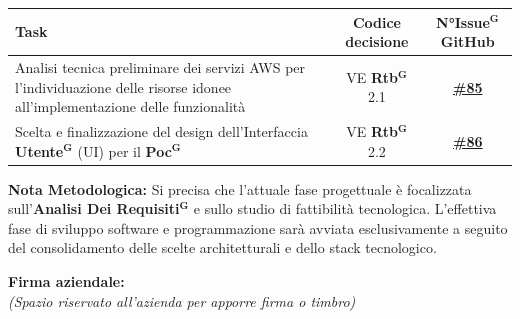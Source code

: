 \documentclass[a4paper,12pt]{article}
\newcommand{\term}[1]{\textbf{#1}$^\mathbf{G}$}
\begin{document}
\begin{center}
\small
\renewcommand{\arraystretch}{1.2} 
\begin{tabular}{|p{}|c|c|}
\hline
\rowcolor{gray!60} 
\textbf{Task} & \textbf{Codice decisione} & \textbf{N°\term{Issue} GitHub} \\
\hline
\rowcolor{white}
Analisi tecnica preliminare dei servizi AWS per l'individuazione delle risorse idonee all'implementazione delle funzionalità & VE \term{Rtb} 2.1 & \href{https://github.com/SWE-BitByBit/SWE-docs/issues/85}{\textbf{\#85}} \\
\hline
\rowcolor{gray!20}
Scelta e finalizzazione del design dell'Interfaccia \term{Utente} (UI) per il \term{Poc} & VE \term{Rtb} 2.2 & \href{https://github.com/SWE-BitByBit/SWE-docs/issues/86}{\textbf{\#86}} \\
\hline
\end{tabular}
\end{center}

\textbf{Nota Metodologica:} Si precisa che l'attuale fase progettuale è focalizzata sull'\term{Analisi Dei Requisiti} e sullo studio di fattibilità tecnologica. L'effettiva fase di sviluppo software e programmazione sarà avviata esclusivamente a seguito del consolidamento delle scelte architetturali e dello stack tecnologico.

\vspace*{\fill} %
\noindent
\begin{minipage}{0.60\textwidth}
    {\small
    \textbf{Firma aziendale:}\\[0.3cm]
    \textit{(Spazio riservato all’azienda per apporre firma o timbro)}\\[0.8cm]
    \fbox{\rule{0pt}{2.5cm}\rule{5cm}{0pt}} %
    }
\end{minipage}
\end{document}
